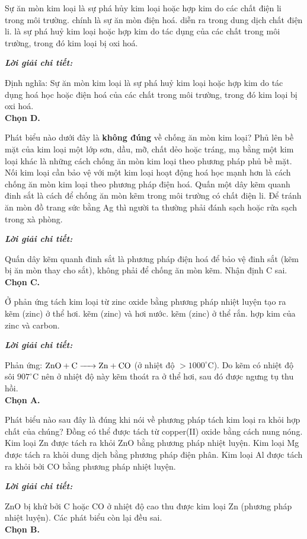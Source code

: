 \documentclass[11pt,a4paper]{article}
\def\loigiai#1{
\par\begingroup\color{blue!80!black}\small
\noindent\textbf{\textit{Lời giải chi tiết:}}\par
#1\par\endgroup}
\begin{document}
\begin{ex}
Sự ăn mòn kim loại
\choice
{là sự phá hủy kim loại hoặc hợp kim do các chất điện li trong môi trường.}
{chính là sự ăn mòn điện hoá.}
{diễn ra trong dung dịch chất điện li.}
{\True là sự phá huỷ kim loại hoặc hợp kim do tác dụng của các chất trong môi trường, trong đó kim loại bị oxi hoá.}
\loigiai{
Định nghĩa: Sự ăn mòn kim loại là sự phá huỷ kim loại hoặc hợp kim do tác dụng hoá học hoặc điện hoá của các chất trong môi trường, trong đó kim loại bị oxi hoá.\\
\textbf{Chọn D.}}
\end{ex}

\begin{ex}
Phát biểu nào dưới đây là \textbf{không đúng} về chống ăn mòn kim loại?
\choice
{Phủ lên bề mặt của kim loại một lớp sơn, dầu, mỡ, chất dẻo hoặc tráng, mạ bằng một kim loại khác là những cách chống ăn mòn kim loại theo phương pháp phủ bề mặt.}
{Nối kim loại cần bảo vệ với một kim loại hoạt động hoá học mạnh hơn là cách chống ăn mòn kim loại theo phương pháp điện hoá.}
{\True Quấn một dây kẽm quanh đinh sắt là cách để chống ăn mòn kẽm trong môi trường có chất điện li.}
{Để tránh ăn mòn đồ trang sức bằng Ag thì người ta thường phải đánh sạch hoặc rửa sạch trong xà phòng.}
\loigiai{
Quấn dây kẽm quanh đinh sắt là phương pháp điện hoá để bảo vệ đinh sắt (kẽm bị ăn mòn thay cho sắt), không phải để chống ăn mòn kẽm. Nhận định C sai.\\
\textbf{Chọn C.}}
\end{ex}

\begin{ex}
Ở phản ứng tách kim loại từ zinc oxide bằng phương pháp nhiệt luyện tạo ra
\choice
{\True kẽm (zinc) ở thể hơi.}
{kẽm (zinc) và hơi nước.}
{kẽm (zinc) ở thể rắn.}
{hợp kim của zinc và carbon.}
\loigiai{
Phản ứng: $\ce{ZnO + C -> Zn + CO}$ (ở nhiệt độ $> 1000^\circ\text{C}$). Do kẽm có nhiệt độ sôi $907^\circ\text{C}$ nên ở nhiệt độ này kẽm thoát ra ở thể hơi, sau đó được ngưng tụ thu hồi.\\
\textbf{Chọn A.}}
\end{ex}

\begin{ex}
Phát biểu nào sau đây là đúng khi nói về phương pháp tách kim loại ra khỏi hợp chất của chúng?
\choice
{Đồng có thể được tách từ copper(II) oxide bằng cách nung nóng.}
{\True Kim loại Zn được tách ra khỏi ZnO bằng phương pháp nhiệt luyện.}
{Kim loại Mg được tách ra khỏi dung dịch  bằng phương pháp điện phân.}
{Kim loại Al được tách ra khỏi  bởi CO bằng phương pháp nhiệt luyện.}
\loigiai{
ZnO bị khử bởi C hoặc CO ở nhiệt độ cao thu được kim loại Zn (phương pháp nhiệt luyện). Các phát biểu còn lại đều sai.\\
\textbf{Chọn B.}}
\end{ex}
\end{document}
